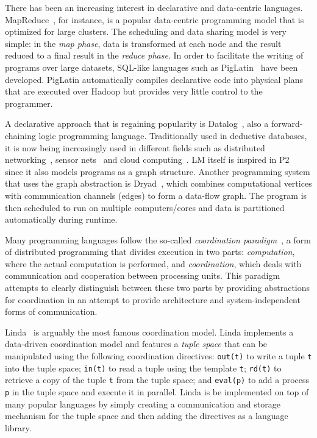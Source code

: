 There has been an increasing interest in declarative and data-centric
languages. MapReduce~\cite{Dean:2008:MSD:1327452.1327492}, for instance, is a
popular data-centric programming model that is optimized for large clusters. The
scheduling and data sharing model is very simple: in the \emph{map phase}, data
is transformed at each node and the result reduced to a final result in the
\emph{reduce phase}. In order to facilitate the writing of programs over large
datasets, SQL-like languages such as
PigLatin~\cite{Olston:2008:PLN:1376616.1376726} have been developed.
PigLatin automatically compiles declarative code into physical plans
that are executed over Hadoop but provides very little control to the
programmer.

A declarative approach that is regaining popularity is
Datalog~\cite{Ullman:1990:PDK:533142}, also a forward-chaining logic programming
language. Traditionally used in deductive databases, it is now being increasingly used in different fields
such as distributed networking~\cite{Loo-condie-garofalakis-p2}, sensor
nets~\cite{Chu:2007:DID:1322263.1322281} and cloud computing~\cite{alvaro:boom}.
LM itself is inspired in P2~\cite{Loo-condie-garofalakis-p2} since it also models
programs as a graph structure. Another programming system that uses the graph
abstraction is Dryad~\cite{Isard:2007:DDD:1272996.1273005}, which combines computational vertices
with communication channels (edges) to form a data-flow graph. The program is
then scheduled to run on multiple computers/cores and data is partitioned
automatically during runtime.

Many programming languages follow the so-called \emph{coordination
paradigm}~\cite{Papadopoulos98coordinationmodels}, a form of distributed
programming that divides execution in two parts: \emph{computation}, where the actual
computation is performed, and \emph{coordination}, which deals with
communication and cooperation between processing units. This paradigm attempts
to clearly distinguish between these two parts by providing abstractions for
coordination in an attempt to provide architecture and system-independent forms
of communication.  

Linda~\cite{linda} is arguably the most famous coordination model. Linda
implements a data-driven coordination model and features a \emph{tuple space}
that can be manipulated using the following coordination directives:
\texttt{out(t)} to write a tuple \texttt{t} into the tuple space; \texttt{in(t)}
to read a tuple using the template \texttt{t}; \texttt{rd(t)} to retrieve a copy of
the tuple \texttt{t} from the tuple space; and \texttt{eval(p)} to add a process
\texttt{p} in the tuple space and execute it in parallel. 
Linda is be implemented on top of many
popular languages by simply creating a communication and storage mechanism for
the tuple space and then adding the directives as a language library.

